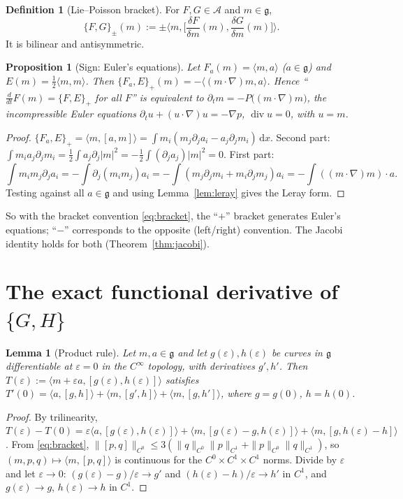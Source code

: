 \documentclass[11pt]{article}
\newtheorem{proposition}[theorem]{Proposition}
\newtheorem{lemma}[theorem]{Lemma}
\theoremstyle{definition}
\newtheorem{definition}[theorem]{Definition}
\newcommand{\g}{\mathfrak{g}}
\newcommand{\ip}[2]{\langle #1,#2\rangle}
\newcommand{\dd}{\,\mathrm{d}x}
\renewcommand{\div}{\operatorname{div}}
\newcommand{\dF}[1]{\frac{\delta #1}{\delta m}}
\begin{document}
\begin{definition}[Lie--Poisson bracket]
For $F,G\in\mathcal A$ and $m\in\g$,
\[\{F,G\}_\pm(m):=\pm\Big\langle m,\Big[\dF F(m),\dF G(m)\Big]\Big\rangle .\]
It is bilinear and antisymmetric.
\end{definition}

\begin{proposition}[Sign: Euler's equations]\label{prop:euler}
Let $F_a(m)=\ip ma$ ($a\in\g$) and $E(m)=\tfrac12\ip mm$. Then
$\{F_a,E\}_+(m)=-\ip{(m\cdot\nabla)m}{a}$. Hence ``$\frac{d}{dt}F(m)=\{F,E\}_+$ for all $F$'' is
equivalent to $\partial_tm=-P\big((m\cdot\nabla)m\big)$, the incompressible Euler equations
$\partial_tu+(u\cdot\nabla)u=-\nabla p$, $\div u=0$, with $u=m$.
\end{proposition}
\begin{proof}
$\{F_a,E\}_+=\ip m{[a,m]}=\int m_i(m_j\partial_ja_i-a_j\partial_jm_i)\dd$. Second part:
$\int m_ia_j\partial_jm_i=\tfrac12\int a_j\partial_j|m|^2=-\tfrac12\int(\partial_ja_j)|m|^2=0$.
First part:
\[\int m_im_j\partial_ja_i=-\int\partial_j(m_im_j)a_i=-\int(m_j\partial_jm_i+m_i\partial_jm_j)a_i=-\int((m\cdot\nabla)m)\cdot a.\]
Testing against all $a\in\g$ and using Lemma~\ref{lem:leray} gives the Leray form.
\end{proof}
So with the bracket convention \eqref{eq:bracket}, the ``$+$'' bracket generates Euler's equations;
``$-$'' corresponds to the opposite (left/right) convention. The Jacobi identity holds for both
(Theorem~\ref{thm:jacobi}).

\section{The exact functional derivative of $\{G,H\}$}\label{sec:deriv}
\begin{lemma}[Product rule]\label{lem:product}
Let $m,a\in\g$ and let $g(\varepsilon),h(\varepsilon)$ be curves in $\g$ differentiable at
$\varepsilon=0$ in the $C^\infty$ topology, with derivatives $g',h'$. Then
$T(\varepsilon):=\ip{m+\varepsilon a}{[g(\varepsilon),h(\varepsilon)]}$ satisfies
$T'(0)=\ip a{[g,h]}+\ip m{[g',h]}+\ip m{[g,h']}$, where $g=g(0)$, $h=h(0)$.
\end{lemma}
\begin{proof}
By trilinearity,
$T(\varepsilon)-T(0)=\varepsilon\ip a{[g(\varepsilon),h(\varepsilon)]}+\ip m{[g(\varepsilon)-g,h(\varepsilon)]}+\ip m{[g,h(\varepsilon)-h]}$.
From \eqref{eq:bracket}, $\|[p,q]\|_{C^0}\le 3(\|q\|_{C^0}\|p\|_{C^1}+\|p\|_{C^0}\|q\|_{C^1})$, so
$(m,p,q)\mapsto\ip m{[p,q]}$ is continuous for the $C^0\times C^1\times C^1$ norms.
Divide by $\varepsilon$ and let $\varepsilon\to0$: $(g(\varepsilon)-g)/\varepsilon\to g'$ and
$(h(\varepsilon)-h)/\varepsilon\to h'$ in $C^1$, and $g(\varepsilon)\to g$, $h(\varepsilon)\to h$ in
$C^1$.
\end{proof}
\end{document}
